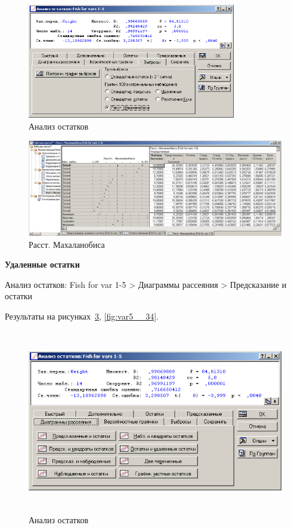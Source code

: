 \begin{figure}[!h]
  \centering

  \includegraphics[height=5cm]
  {inc/var5__31.PNG}

  \caption{Анализ остатков}

  \label{fig:var5__31}
\end{figure}

\begin{figure}[!h]
  \centering

  \includegraphics[width=16cm]
  {inc/var5__32.PNG}

  \caption{Расст. Махаланобиса}

  \label{fig:var5__32}
\end{figure}

\newpage

\textbf{Удаленные остатки}

Анализ остатков: Fish for var 1-5 > Диаграммы рассеяния >  Предсказание и остатки

Результаты на рисунках~\ref{fig:var5__33}, \ref{fig:var5__34}.

\begin{figure}[!h]
  \centering

  \includegraphics[height=8cm]
  {inc/var5__33.PNG}

  \caption{Анализ остатков}

  \label{fig:var5__33}
\end{figure}

